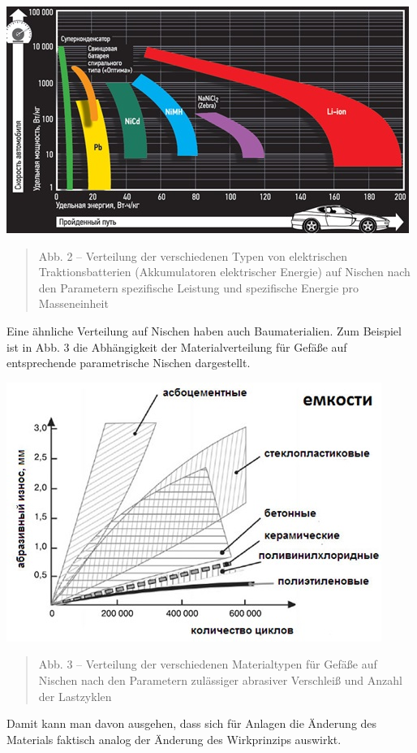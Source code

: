 \documentclass[11pt,a4paper]{article}
\begin{document}
\begin{center}
  \includegraphics[width=.7\textwidth]{2164-2.jpg}
  \begin{quote}
    Abb. 2 -- Verteilung der verschiedenen Typen von elektrischen
    Traktionsbatterien (Akkumulatoren elektrischer Energie) auf Nischen nach
    den Parametern spezifische Leistung und spezifische Energie pro
    Masseneinheit
  \end{quote}
\end{center}
Eine ähnliche Verteilung auf Nischen haben auch Baumaterialien. Zum Beispiel
ist in Abb. 3 die Abhängigkeit der Materialverteilung für Gefäße auf
entsprechende parametrische Nischen dargestellt.
\begin{center}
  \includegraphics[width=.7\textwidth]{2164-3.jpg}
  \begin{quote}
    Abb. 3 -- Verteilung der verschiedenen Materialtypen für Gefäße auf
    Nischen nach den Parametern zulässiger abrasiver Verschleiß und Anzahl der
    Lastzyklen
  \end{quote}
\end{center}
Damit kann man davon ausgehen, dass sich für Anlagen die Änderung des
Materials faktisch analog der Änderung des Wirkprinzips auswirkt.
\end{document}
